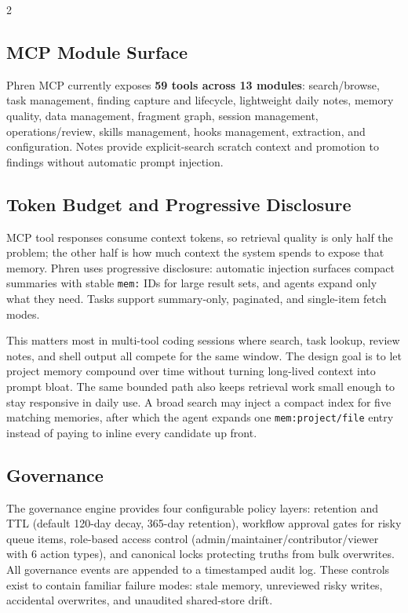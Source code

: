 \documentclass[10pt]{article}
\begin{document}
\begin{multicols}{2}
\subsection{MCP Module Surface}
Phren MCP currently exposes \textbf{59 tools across 13 modules}: search/browse, task management, finding capture and lifecycle, lightweight daily notes, memory quality, data management, fragment graph, session management, operations/review, skills management, hooks management, extraction, and configuration. Notes provide explicit-search scratch context and promotion to findings without automatic prompt injection.

\subsection{Token Budget and Progressive Disclosure}
\label{sec:context-opt}
MCP tool responses consume context tokens, so retrieval quality is only half the problem; the other half is how much context the system spends to expose that memory. Phren uses progressive disclosure: automatic injection surfaces compact summaries with stable \texttt{mem:} IDs for large result sets, and agents expand only what they need. Tasks support summary-only, paginated, and single-item fetch modes.

This matters most in multi-tool coding sessions where search, task lookup, review notes, and shell output all compete for the same window. The design goal is to let project memory compound over time without turning long-lived context into prompt bloat. The same bounded path also keeps retrieval work small enough to stay responsive in daily use. A broad search may inject a compact index for five matching memories, after which the agent expands one \texttt{mem:project/file} entry instead of paying to inline every candidate up front.

\subsection{Governance}
\label{sec:governance}
The governance engine \cite{phren-shared} provides four configurable policy layers: retention and TTL (default 120-day decay, 365-day retention), workflow approval gates for risky queue items, role-based access control (admin/maintainer/contributor/viewer with 6 action types), and canonical locks protecting truths from bulk overwrites. All governance events are appended to a timestamped audit log. These controls exist to contain familiar failure modes: stale memory, unreviewed risky writes, accidental overwrites, and unaudited shared-store drift.


\end{multicols}
\end{document}
